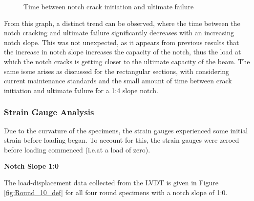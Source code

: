 \documentclass[11pt,a4paper]{article}
\numberwithin{equation}{subsection}
\begin{document}
\begin{figure}[h]
	\begin{center}
	\end{center}
	\caption{Time between notch crack initiation and ultimate failure}
	\label{fig:Round-Crack-fail}
\end{figure}

From this graph, a distinct trend can be observed, where the time between the notch cracking and ultimate failure significantly decreases with an increasing notch slope. This was not unexpected, as it appears from previous results that the increase in notch slope increases the capacity of the notch, thus the load at which the notch cracks is getting closer to the ultimate capacity of the beam. The same issue arises as discussed for the rectangular sections, with considering current maintenance standards and the small amount of time between crack initiation and ultimate failure for a 1:4 slope notch.

\subsubsection{Strain Gauge Analysis}
Due to the curvature of the specimens, the strain gauges experienced some initial strain before loading began. To account for this, the strain gauges were zeroed before loading commenced (i.e.at a load of zero).

\pagebreak

\noindent
\textbf{Notch Slope 1:0}\par
\noindent
The load-displacement data collected from the LVDT is given in Figure \ref{fig:Round_10_def} for all four round specimens with a notch slope of 1:0.
\end{document}
